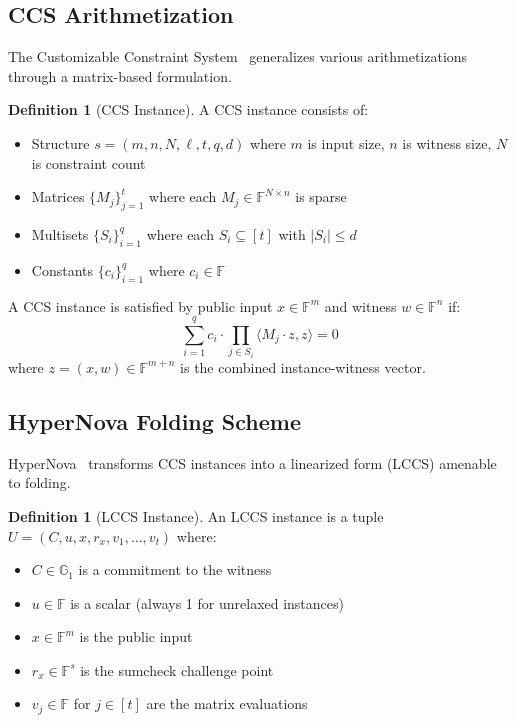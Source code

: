 \documentclass[11pt,a4paper]{article}
\theoremstyle{plain}
\theoremstyle{definition}
\newtheorem{definition}[theorem]{Definition}
\newcommand{\F}{\mathbb{F}}
\newcommand{\G}{\mathbb{G}}
\begin{document}
\subsection{CCS Arithmetization}

The Customizable Constraint System~\cite{ccs} generalizes various arithmetizations through a matrix-based formulation.

\begin{definition}[CCS Instance]
A CCS instance consists of:
\begin{itemize}
\item Structure $s = (m, n, N, \ell, t, q, d)$ where $m$ is input size, $n$ is witness size, $N$ is constraint count
\item Matrices $\{M_j\}_{j=1}^t$ where each $M_j \in \F^{N \times n}$ is sparse
\item Multisets $\{S_i\}_{i=1}^q$ where each $S_i \subseteq [t]$ with $|S_i| \leq d$
\item Constants $\{c_i\}_{i=1}^q$ where $c_i \in \F$
\end{itemize}
\end{definition}

A CCS instance is satisfied by public input $x \in \F^m$ and witness $w \in \F^n$ if:
\begin{equation}
\sum_{i=1}^q c_i \cdot \prod_{j \in S_i} \langle M_j \cdot z, z \rangle = 0
\end{equation}
where $z = (x, w) \in \F^{m+n}$ is the combined instance-witness vector.

\subsection{HyperNova Folding Scheme}

HyperNova~\cite{hypernova} transforms CCS instances into a linearized form (LCCS) amenable to folding.

\begin{definition}[LCCS Instance]
An LCCS instance is a tuple $U = (C, u, x, r_x, v_1, \ldots, v_t)$ where:
\begin{itemize}
\item $C \in \G_1$ is a commitment to the witness
\item $u \in \F$ is a scalar (always 1 for unrelaxed instances)
\item $x \in \F^m$ is the public input
\item $r_x \in \F^s$ is the sumcheck challenge point
\item $v_j \in \F$ for $j \in [t]$ are the matrix evaluations
\end{itemize}
\end{definition}
\end{document}
